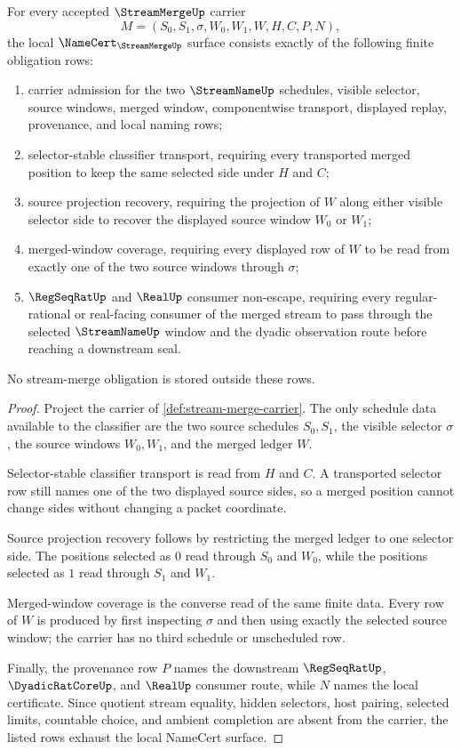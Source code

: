 \begin{theorem}
\label{thm:stream-merge-namecert-obligations}
For every accepted $\StreamMergeUp$ carrier
$$
M=(S_0,S_1,\sigma,W_0,W_1,W,H,C,P,N),
$$
the local $\NameCert_{\StreamMergeUp}$ surface consists exactly of the following finite obligation rows:
\begin{enumerate}
\item carrier admission for the two $\StreamNameUp$ schedules, visible selector, source windows, merged window, componentwise transport, displayed replay, provenance, and local naming rows;
\item selector-stable classifier transport, requiring every transported merged position to keep the same selected side under $H$ and $C$;
\item source projection recovery, requiring the projection of $W$ along either visible selector side to recover the displayed source window $W_0$ or $W_1$;
\item merged-window coverage, requiring every displayed row of $W$ to be read from exactly one of the two source windows through $\sigma$;
\item $\RegSeqRatUp$ and $\RealUp$ consumer non-escape, requiring every regular-rational or real-facing consumer of the merged stream to pass through the selected $\StreamNameUp$ window and the dyadic observation route before reaching a downstream seal.
\end{enumerate}
No stream-merge obligation is stored outside these rows.
\end{theorem}
\begin{proof}
Project the carrier of \autoref{def:stream-merge-carrier}. The only schedule data available to the classifier are the two source schedules $S_0,S_1$, the visible selector $\sigma$, the source windows $W_0,W_1$, and the merged ledger $W$.

Selector-stable classifier transport is read from $H$ and $C$. A transported selector row still names one of the two displayed source sides, so a merged position cannot change sides without changing a packet coordinate.

Source projection recovery follows by restricting the merged ledger to one selector side. The positions selected as $0$ read through $S_0$ and $W_0$, while the positions selected as $1$ read through $S_1$ and $W_1$.

Merged-window coverage is the converse read of the same finite data. Every row of $W$ is produced by first inspecting $\sigma$ and then using exactly the selected source window; the carrier has no third schedule or unscheduled row.

Finally, the provenance row $P$ names the downstream $\RegSeqRatUp$, $\DyadicRatCoreUp$, and $\RealUp$ consumer route, while $N$ names the local certificate. Since quotient stream equality, hidden selectors, host pairing, selected limits, countable choice, and ambient completion are absent from the carrier, the listed rows exhaust the local NameCert surface.
\end{proof}

